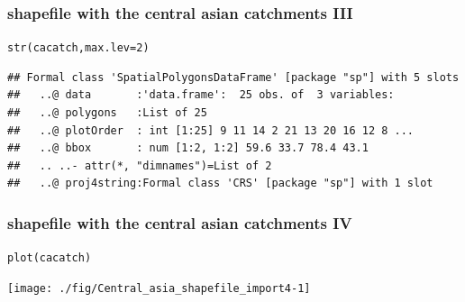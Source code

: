 \documentclass[xcolor=table, xcolor=dvipsnames]{beamer}\usepackage[]{graphicx}\usepackage[]{color}
\makeatletter
\newcommand{\hlnum}[1]{\textcolor[rgb]{0,0,0}{#1}}
\newcommand{\hlstd}[1]{\textcolor[rgb]{0,0,0}{#1}}
\newcommand{\hlkwc}[1]{\textcolor[rgb]{1,0,1}{#1}}
\newcommand{\hlkwd}[1]{\textcolor[rgb]{0,0,1}{#1}}
\newenvironment{kframe}{%
 \def\at@end@of@kframe{}%
 \ifinner\ifhmode%
  \def\at@end@of@kframe{\end{minipage}}%
  \begin{minipage}{\columnwidth}%
 \fi\fi%
 \def\FrameCommand##1{\hskip\@totalleftmargin \hskip-\fboxsep
 \colorbox{shadecolor}{##1}\hskip-\fboxsep
     \hskip-\linewidth \hskip-\@totalleftmargin \hskip\columnwidth}%
 \MakeFramed {\advance\hsize-\width
   \@totalleftmargin\z@ \linewidth\hsize
   \@setminipage}}%
 {\par\unskip\endMakeFramed%
 \at@end@of@kframe}
\newenvironment{knitrout}{}{} %
\makeatother
\begin{document}

\begin{frame}[fragile]\frametitle{shapefile with the central asian catchments III}
\begin{knitrout}\footnotesize
{}\color{fgcolor}\begin{kframe}
\begin{alltt}
\hlkwd{str}\hlstd{(cacatch,} \hlkwc{max.lev}\hlstd{=}\hlnum{2}\hlstd{)}
\end{alltt}
\begin{verbatim}
## Formal class 'SpatialPolygonsDataFrame' [package "sp"] with 5 slots
##   ..@ data       :'data.frame':	25 obs. of  3 variables:
##   ..@ polygons   :List of 25
##   ..@ plotOrder  : int [1:25] 9 11 14 2 21 13 20 16 12 8 ...
##   ..@ bbox       : num [1:2, 1:2] 59.6 33.7 78.4 43.1
##   .. ..- attr(*, "dimnames")=List of 2
##   ..@ proj4string:Formal class 'CRS' [package "sp"] with 1 slot
\end{verbatim}
\end{kframe}
\end{knitrout}
\end{frame}


\begin{frame}[fragile]\frametitle{shapefile with the central asian catchments IV}
\begin{knitrout}
\color{fgcolor}\begin{kframe}
\begin{alltt}
\hlkwd{plot}\hlstd{(cacatch)}
\end{alltt}
\end{kframe}

{\centering \texttt{[image: ./fig/Central\_asia\_shapefile\_import4-1]} 

}



\end{knitrout}
\end{frame}

\end{document}
